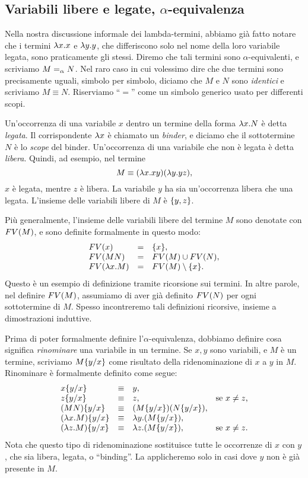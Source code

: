 \documentclass{article}
\begin{document}
\subsection{Variabili libere e legate, $\alpha$-equivalenza}

Nella nostra discussione informale dei lambda-termini, abbiamo gi\`a fatto
notare che i termini $\lambda x.x$ e $\lambda y.y$, che differiscono solo nel
nome della loro variabile legata, sono praticamente gli stessi. Diremo che
tali termini sono $\alpha$-equivalenti, e scriviamo $M=_{\alpha} N$. Nel raro
caso in cui volessimo dire che due termini sono precisamente uguali, simbolo
per simbolo, diciamo che $M$ e $N$ sono {\em identici} e scriviamo $M\equiv N$.
Riserviamo ``$=$'' come un simbolo generico usato per differenti scopi.

Un'occorrenza di una variabile $x$ dentro un termine della forma $\lambda x.N$
\`e detta {\em legata}. Il corrispondente $\lambda x$ \`e chiamato un {\em binder}, e
diciamo che il sottotermine $N$ \`e lo {\em scope} del binder. Un'occorrenza di
una variabile che non \`e legata \`e detta {\em libera}. Quindi,
ad esempio, nel termine
\[   M \equiv (\lambda x.xy)(\lambda y.yz), \]
$x$ \`e legata, mentre $z$ \`e libera. La variabile $y$ ha sia un'occorrenza libera
che una legata. L'insieme delle variabili libere di $M$ \`e $\{y,z\}$. 

Pi\`u generalmente, l'insieme delle variabili libere del termine $M$ sono
denotate con $FV(M)$, e sono definite formalmente in questo modo:
\[ \begin{array}{lll}
  FV(x) &=& \{x\}, \\
  FV(MN) &=& FV(M)\cup FV(N), \\
  FV(\lambda x.M) &=& FV(M) \setminus \{x\}.
\end{array}
\]
Questo \`e un esempio di definizione tramite ricorsione sui termini. In
altre parole, nel definire $FV(M)$, assumiamo di aver gi\`a definito
$FV(N)$ per ogni sottotermine di $M$. Spesso incontreremo tali
definizioni ricorsive, insieme a dimostrazioni induttive.

Prima di poter formalmente definire l'$\alpha$-equivalenza, dobbiamo definire
cosa significa {\em rinominare} una variabile in un termine. Se $x,y$ sono
variabili, e $M$ \`e un termine, scriviamo $M\{y/x\}$ come risultato della
ridenominazione di $x$ a $y$ in $M$. Rinominare \`e formalmente definito come segue:
\[ \begin{array}{llll}
  x\{y/x\} &\equiv& y, \\
  z\{y/x\} &\equiv& z, & \mbox{se $x\neq z$,} \\
  (MN)\{y/x\} &\equiv& (M\{y/x\})(N\{y/x\}), \\
  (\lambda x.M)\{y/x\} &\equiv& \lambda y.(M\{y/x\}), \\
  (\lambda z.M)\{y/x\} &\equiv& \lambda z.(M\{y/x\}), & \mbox{se
  $x\neq z$.}
\end{array}
\]
Nota che questo tipo di ridenominazione sostituisce tutte le occorrenze di $x$ con
$y$, che sia libera, legata, o ``binding''. La applicheremo solo in casi dove
$y$ non \`e gi\`a presente in $M$.
\end{document}
